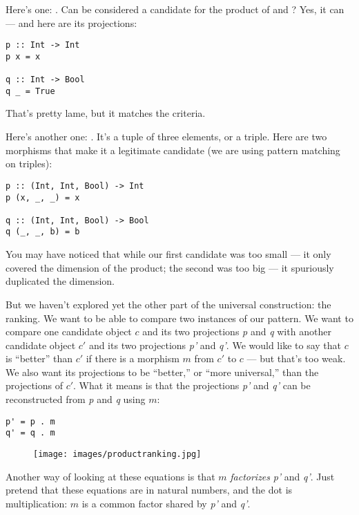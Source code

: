 Here's one: . Can  be considered a candidate for
the product of  and ? Yes, it can --- and here
are its projections:

\begin{Verbatim}
p :: Int -> Int
p x = x

q :: Int -> Bool
q _ = True
\end{Verbatim}
That's pretty lame, but it matches the criteria.

Here's another one: . It's a tuple of three
elements, or a triple. Here are two morphisms that make it a legitimate
candidate (we are using pattern matching on triples):

\begin{Verbatim}
p :: (Int, Int, Bool) -> Int
p (x, _, _) = x

q :: (Int, Int, Bool) -> Bool
q (_, _, b) = b
\end{Verbatim}
You may have noticed that while our first candidate was too small --- it
only covered the  dimension of the product; the second was
too big --- it spuriously duplicated the  dimension.

But we haven't explored yet the other part of the universal
construction: the ranking. We want to be able to compare two instances
of our pattern. We want to compare one candidate object $c$ and its
two projections \emph{p} and \emph{q} with another candidate object
$c'$ and its two projections \emph{p'} and \emph{q'}. We would like
to say that $c$ is ``better'' than $c'$ if there is a morphism
$m$ from $c'$ to $c$ --- but that's too weak. We also
want its projections to be ``better,'' or ``more universal,'' than the
projections of $c'$. What it means is that the projections
\emph{p'} and \emph{q'} can be reconstructed from \emph{p} and \emph{q}
using $m$:

\begin{Verbatim}
p' = p . m
q' = q . m
\end{Verbatim}

\begin{figure}[H]
\centering
\texttt{[image: images/productranking.jpg]}
\end{figure}

\noindent
Another way of looking at these equations is that $m$
\emph{factorizes} \emph{p'} and \emph{q'}. Just pretend that these
equations are in natural numbers, and the dot is multiplication:
$m$ is a common factor shared by \emph{p'} and \emph{q'}.

